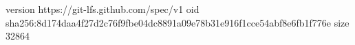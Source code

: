 version https://git-lfs.github.com/spec/v1
oid sha256:8d174daa4f27d2c76f9fbe04dc8891a09e78b31e916f1cce54abf8e6fb1f776e
size 32864
